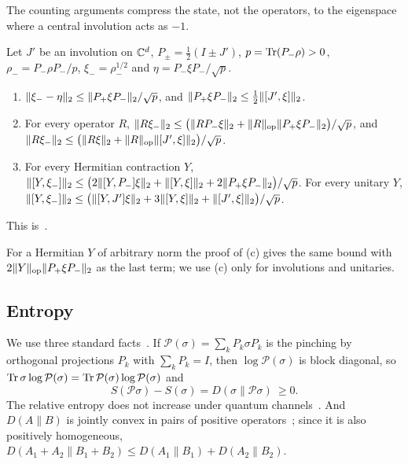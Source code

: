 The counting arguments compress the state, not the operators, to the eigenspace where a central involution acts as
$-1$.

\begin{lemma}\label{lem:sector}
Let $J'$ be an involution on $\mathbb C^d$, $P_\pm=\frac12(I\pm J')$, $p=\operatorname{Tr}(P_-\rho)>0$, $\rho_-=P_-\rho P_-/p$,
$\xi_-=\rho_-^{1/2}$ and $\eta=P_-\xi P_-/\sqrt p$.
\begin{enumerate}[label=(\alph*),itemsep=1pt]
\item $\lVert \xi_--\eta\rVert_2\le\lVert P_+\xi P_-\rVert_2/\sqrt p$, and $\lVert P_+\xi P_-\rVert_2\le\frac12\lVert [J',\xi]\rVert_2$.
\item For every operator $R$, $\lVert R\xi_-\rVert_2\le\bigl(\lVert RP_-\xi\rVert_2+\lVert R\rVert_{\mathrm{op}}\lVert P_+\xi P_-\rVert_2\bigr)/\sqrt p$, and
$\lVert R\xi_-\rVert_2\le\bigl(\lVert R\xi\rVert_2+\lVert R\rVert_{\mathrm{op}}\lVert [J',\xi]\rVert_2\bigr)/\sqrt p$.
\item For every Hermitian contraction $Y$,
$\lVert [Y,\xi_-]\rVert_2\le\bigl(2\lVert [Y,P_-]\xi\rVert_2+\lVert [Y,\xi]\rVert_2+2\lVert P_+\xi P_-\rVert_2\bigr)/\sqrt p$. For every unitary $Y$,
$\lVert [Y,\xi_-]\rVert_2\le\bigl(\lVert [Y,J']\xi\rVert_2+3\lVert [Y,\xi]\rVert_2+\lVert [J',\xi]\rVert_2\bigr)/\sqrt p$.
\end{enumerate}
\end{lemma}

This is~\cite[Lemma~3.10]{DM-game}.

For a Hermitian $Y$ of arbitrary norm the proof of (c) gives the same bound with $2\lVert Y\rVert_{\mathrm{op}}\lVert P_+\xi P_-\rVert_2$ as the last
term; we use (c) only for involutions and unitaries.

\subsection{Entropy}\label{sec:prelim-entropy}

We use three standard facts~\cite[Section~3.7]{DM-game}. If $\mathcal P(\sigma)=\sum_kP_k\sigma P_k$ is the pinching by orthogonal projections
$P_k$ with $\sum_kP_k=I$, then $\log\mathcal P(\sigma)$ is block diagonal, so $\operatorname{Tr}\sigma\log\mathcal P(\sigma)=
\operatorname{Tr}\mathcal P(\sigma)\log\mathcal P(\sigma)$ and
\begin{equation}\label{eq:pinching}
S(\mathcal P\sigma)-S(\sigma)=D(\sigma\|\mathcal P\sigma)\ \ge0 .
\end{equation}
The relative entropy does not increase under quantum channels~\cite{Lin75,Uhl77}. And $D(A\|B)$ is jointly convex in
pairs of positive operators~\cite{Lie73,Lin74}; since it is also positively homogeneous,
$D(A_1+A_2\|B_1+B_2)\le D(A_1\|B_1)+D(A_2\|B_2)$.



